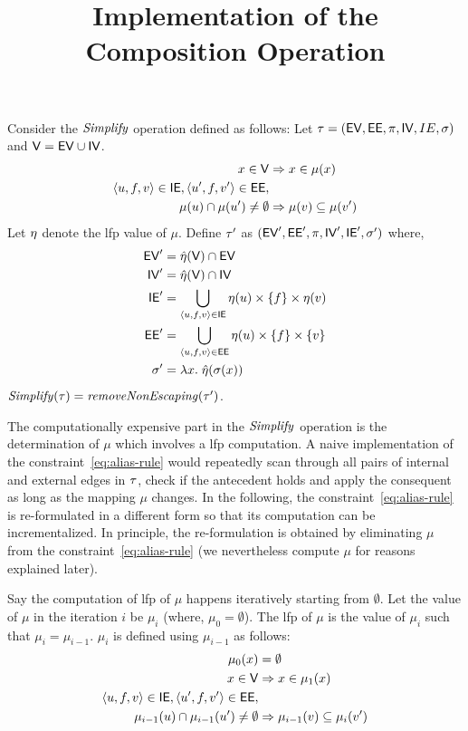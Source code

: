 \documentclass[12pt]{article}
\begin{document}
\title{Implementation of the Composition Operation}
\maketitle




Consider the $\mathit{Simplify}$ operation defined as follows:
Let $\tau = (\mathsf{EV}, \mathsf{EE},\pi,\mathsf{IV},IE,\sigma)$ and $\mathsf{V} = \mathsf{EV} \cup \mathsf{IV}$.
%
\begin{align}
x \in \mathsf{V} & \Rightarrow  x \in \mu(x) \\
\nonumber
\langle u,f,v \rangle \in \mathsf{IE}, \langle u',f,v' \rangle \in \mathsf{EE}, \\
\mu(u) \cap \mu(u') \ne \emptyset 
& \Rightarrow \mu(v) \subseteq \mu(v') \label{eq:alias-rule}
\end{align}
%
Let $\eta$ denote the lfp value of $\mu$. Define $\tau'$ as $(\mathsf{EV}', \mathsf{EE}',\pi,\mathsf{IV}',\mathsf{IE}',\sigma')$
where,
%
\begin{align*}
\mathsf{EV}'		&= \hat{\eta}(\mathsf{V}) \cap \mathsf{EV} \\
\mathsf{IV}'		&= \hat{\eta}(\mathsf{V}) \cap \mathsf{IV} \\
\mathsf{IE}' 		&= \bigcup_{\langle u,f,v \rangle \in \mathsf{IE}} \eta(u) \times \{ f \} \times \eta(v) \\ 
\mathsf{EE}' 		&= \bigcup_{\langle u,f,v \rangle \in \mathsf{EE}} \eta(u) \times \{ f \} \times \{ v\} \\
\sigma' 	&= \lambda x. \; \hat{\eta}(\sigma(x)) \\
\end{align*}
%
$\mathit{Simplify}(\tau) = \mathit{removeNonEscaping}(\tau')$.

The computationally expensive part in the $\mathit{Simplify}$ operation is the determination of $\mu$ which involves a lfp computation.
A naive implementation of the constraint~\ref{eq:alias-rule} would repeatedly scan through all pairs of internal
and external edges in $\tau$, check if the antecedent holds and apply the consequent 
as long as the mapping $\mu$ changes. 
In the following, the constraint~\ref{eq:alias-rule} is re-formulated in a different form so that 
its computation can be incrementalized.
In principle, the re-formulation is obtained by eliminating $\mu$ from the constraint~\ref{eq:alias-rule}
(we nevertheless compute $\mu$ for reasons explained later).

Say the computation of lfp of $\mu$ happens iteratively starting from $\emptyset$.
Let the value of $\mu$ in the iteration $i$ be $\mu_i$ (where, $\mu_0 = \emptyset$).
The lfp of $\mu$ is the value of $\mu_i$ such that $\mu_i = \mu_{i-1}$.
$\mu_i$ is defined using $\mu_{i-1}$ as follows:
%
\begin{align}
\mu_0(x) &= \emptyset \\
x \in \mathsf{V} & \Rightarrow  x \in \mu_1(x) \\
\nonumber
\langle u,f,v \rangle \in \mathsf{IE}, \langle u',f,v' \rangle \in \mathsf{EE}, \\
\mu_{i-1}(u) \cap \mu_{i-1}(u') \ne \emptyset  & \Rightarrow \mu_{i-1}(v) \subseteq \mu_i(v') 
\end{align}
\end{document}
